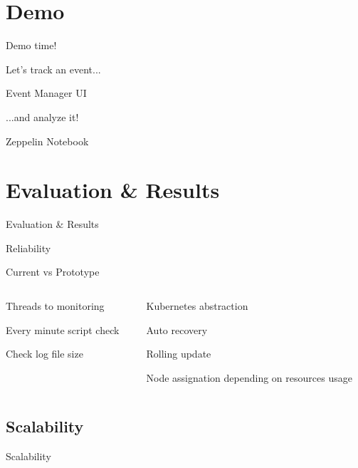 \documentclass{beamer}
\newenvironment{wideitemize}{\itemize\addtolength{\itemsep}{20pt}}{\enditemize}
\newcommand{\hugeframedouble}[2]{
\begin{frame}[c]
  \begin{center}
    \huge\textcolor{title}{#1}
    \vfill

    \normalsize #2

  \end{center}

\end{frame}
}
\newcommand{\hugeframe}[1]{
\begin{frame}[c]
  \begin{center}
    \huge\textcolor{title}{#1}
  \end{center}

\end{frame}
}
\begin{document}
\section{Demo}
\hugeframe{Demo time!}


\hugeframedouble{Let's track an event...}{Event Manager UI}
\hugeframedouble{...and analyze it!}{Zeppelin Notebook}



\section{Evaluation \& Results}
\hugeframe{Evaluation \& Results}
\hugeframe{Reliability}

\begin{frame}{Current vs Prototype}
  \begin{columns}[T] %
    \begin{column}{.48\textwidth}
      \begin{wideitemize}
        \item Threads to monitoring
        \item Every minute script check
        \item Check log file size
      \end{wideitemize}
    
    \end{column}%
    \hfill%
    \begin{column}{.48\textwidth}
      \begin{wideitemize}
        \item Kubernetes abstraction
        \item Auto recovery
        \item Rolling update
        \item Node assignation depending on resources usage
      \end{wideitemize}
    
    \end{column}%
  \end{columns}
\end{frame}



\subsection{Scalability}
\hugeframe{Scalability}
\end{document}
